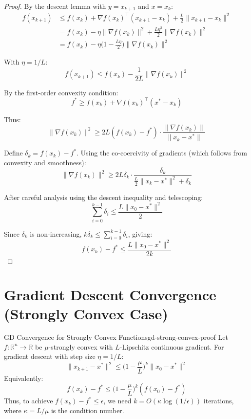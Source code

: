 \documentclass[../main.tex]{subfiles}
\begin{document}
\begin{proof}
By the descent lemma with $y = x_{k+1}$ and $x = x_k$:
\begin{align}
f(x_{k+1}) &\leq f(x_k) + \nabla f(x_k)^\top(x_{k+1} - x_k) + \frac{L}{2}\|x_{k+1} - x_k\|^2 \\
&= f(x_k) - \eta\|\nabla f(x_k)\|^2 + \frac{L\eta^2}{2}\|\nabla f(x_k)\|^2 \\
&= f(x_k) - \eta\Big(1 - \frac{L\eta}{2}\Big)\|\nabla f(x_k)\|^2
\end{align}

With $\eta = 1/L$:
\[
f(x_{k+1}) \leq f(x_k) - \frac{1}{2L}\|\nabla f(x_k)\|^2
\]

By the first-order convexity condition:
\[
f^* \geq f(x_k) + \nabla f(x_k)^\top(x^* - x_k)
\]

Thus:
\[
\|\nabla f(x_k)\|^2 \geq 2L(f(x_k) - f^*) \cdot \frac{\|\nabla f(x_k)\|}{\|x_k - x^*\|}
\]

Define $\delta_k = f(x_k) - f^*$. Using the co-coercivity of gradients (which follows from convexity and smoothness):
\[
\|\nabla f(x_k)\|^2 \geq 2L\delta_k \cdot \frac{\delta_k}{\frac{L}{2}\|x_k - x^*\|^2 + \delta_k}
\]

After careful analysis using the descent inequality and telescoping:
\[
\sum_{i=0}^{k-1} \delta_i \leq \frac{L\|x_0 - x^*\|^2}{2}
\]

Since $\delta_k$ is non-increasing, $k\delta_k \leq \sum_{i=0}^{k-1} \delta_i$, giving:
\[
f(x_k) - f^* \leq \frac{L\|x_0 - x^*\|^2}{2k}
\]
\end{proof}

\section{Gradient Descent Convergence (Strongly Convex Case)}\label{sec:proof-gd-strongly-convex}

\begin{theorem}{GD Convergence for Strongly Convex Functions}{gd-strong-convex-proof}
Let $f: \mathbb{R}^n \to \mathbb{R}$ be $\mu$-strongly convex with $L$-Lipschitz continuous gradient. For gradient descent with step size $\eta = 1/L$:
\[
\|x_{k+1} - x^*\|^2 \leq \Big(1 - \frac{\mu}{L}\Big)^k \|x_0 - x^*\|^2
\]
Equivalently:
\[
f(x_k) - f^* \leq \Big(1 - \frac{\mu}{L}\Big)^k (f(x_0) - f^*)
\]
Thus, to achieve $f(x_k) - f^* \leq \epsilon$, we need $k = O(\kappa \log(1/\epsilon))$ iterations, where $\kappa = L/\mu$ is the condition number.
\end{theorem}
\end{document}
